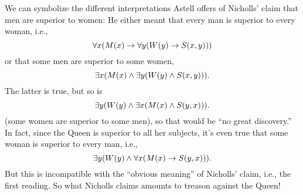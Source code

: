 We can symbolize the different interpretations Astell offers of
Nicholls' claim that men are superior to women:
He either meant that every man is superior to every woman, i.e.,
\[
\forall x(\mathord{M}(x) \rightarrow \forall y(\mathord{W}(y) \rightarrow \mathord{S}(x,y)))
\]
or that some men are superior to some women,
\[
\exists x(\mathord{M}(x) \wedge \exists y(\mathord{W}(y) \wedge \mathord{S}(x,y))).
\]
The latter is true, but so is
\[
\exists y(\mathord{W}(y) \wedge \exists x(\mathord{M}(x) \wedge \mathord{S}(y,x))).
\]
(some women are superior to some men), so that would be ``no great
discovery.''  In fact, since the Queen is superior to all her
subjects, it's even true that some woman is superior to every man,
i.e.,
\[
\exists y(\mathord{W}(y) \land \forall x(\mathord{M}(x) \rightarrow \mathord{S}(y,x))).
\]
But this is incompatible with the ``obvious meaning'' of Nicholls'
claim, i.e., the first reading. So what Nicholls claims amounts to
treason against the Queen!

